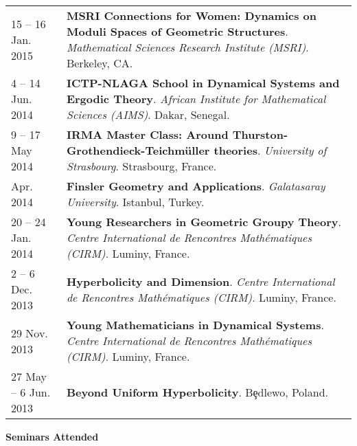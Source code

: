 \begin{center}
{\begin{longtable}{p{}  p{}}
15  -- 16 Jan.  2015 & \textbf{MSRI Connections for Women: Dynamics on Moduli Spaces of Geometric Structures}. \textit{Mathematical Sciences Research Institute (MSRI)}.  Berkeley, CA.  \\ 
4  -- 14 Jun.  2014 & \textbf{ICTP-NLAGA School in Dynamical Systems and Ergodic Theory}. \textit{African Institute for Mathematical Sciences (AIMS)}.  Dakar, Senegal.  \\ 
9  -- 17 May  2014 & \textbf{IRMA Master Class: Around Thurston-Grothendieck-Teichm\"uller theories}. \textit{University of Strasbourg}.  Strasbourg, France.  \\ 
 Apr.  2014 & \textbf{Finsler Geometry and Applications}. \textit{Galatasaray University}.  Istanbul, Turkey.  \\ 
20  -- 24 Jan.  2014 & \textbf{Young Researchers in Geometric Groupy Theory}. \textit{Centre International de Rencontres Math\'ematiques (CIRM)}.  Luminy, France.  \\ 
2  -- 6 Dec.  2013 & \textbf{Hyperbolicity and Dimension}. \textit{Centre International de Rencontres Math\'ematiques (CIRM)}.  Luminy, France.  \\ 
29 Nov.  2013 & \textbf{Young Mathematicians in Dynamical Systems}. \textit{Centre International de Rencontres Math\'ematiques (CIRM)}.  Luminy, France.  \\ 
27 May  -- 6 Jun.  2013 & \textbf{Beyond Uniform Hyperbolicity}.  B\c{e}dlewo, Poland.  
    \end{longtable}
    } 
    \end{center}

    \vspace{-1em}
    

    \textbf{\large Seminars Attended}
    
